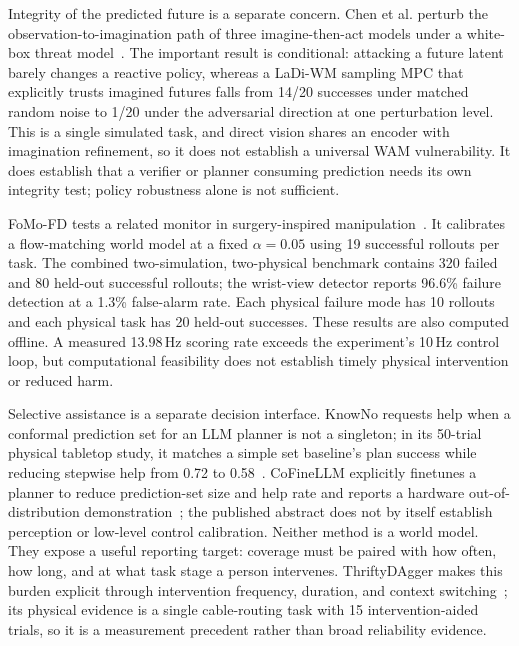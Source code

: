 Integrity of the predicted future is a separate concern. Chen et al. perturb the observation-to-imagination path of three imagine-then-act models under a white-box threat model~\cite{chen2026trustedimagination}. The important result is conditional: attacking a future latent barely changes a reactive policy, whereas a LaDi-WM sampling MPC that explicitly trusts imagined futures falls from 14/20 successes under matched random noise to 1/20 under the adversarial direction at one perturbation level. This is a single simulated task, and direct vision shares an encoder with imagination refinement, so it does not establish a universal WAM vulnerability. It does establish that a verifier or planner consuming prediction needs its own integrity test; policy robustness alone is not sufficient.

FoMo-FD tests a related monitor in surgery-inspired manipulation~\cite{huang2026fomofd}. It calibrates a flow-matching world model at a fixed $\alpha=0.05$ using 19 successful rollouts per task. The combined two-simulation, two-physical benchmark contains 320 failed and 80 held-out successful rollouts; the wrist-view detector reports 96.6\% failure detection at a 1.3\% false-alarm rate. Each physical failure mode has 10 rollouts and each physical task has 20 held-out successes. These results are also computed offline. A measured 13.98\,Hz scoring rate exceeds the experiment's 10\,Hz control loop, but computational feasibility does not establish timely physical intervention or reduced harm.

Selective assistance is a separate decision interface. KnowNo requests help when a conformal prediction set for an LLM planner is not a singleton; in its 50-trial physical tabletop study, it matches a simple set baseline's plan success while reducing stepwise help from 0.72 to 0.58~\cite{ren2023knowno}. CoFineLLM explicitly finetunes a planner to reduce prediction-set size and help rate and reports a hardware out-of-distribution demonstration~\cite{wang2026cofinellm}; the published abstract does not by itself establish perception or low-level control calibration. Neither method is a world model. They expose a useful reporting target: coverage must be paired with how often, how long, and at what task stage a person intervenes. ThriftyDAgger makes this burden explicit through intervention frequency, duration, and context switching~\cite{hoque2022thriftydagger}; its physical evidence is a single cable-routing task with 15 intervention-aided trials, so it is a measurement precedent rather than broad reliability evidence.

